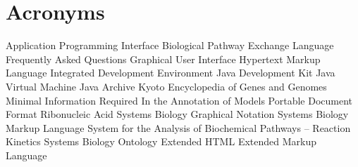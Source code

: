 \chapter{Acronyms}
\begin{acronym}
        {Application Programming Interface}
     {Biological Pathway Exchange Language}
        {Frequently Asked Questions}
        {Graphical User Interface}
       {Hypertext Markup Language}
        {Integrated Development Environment}
        {Java\texttrademark{} Development Kit}
        {Java\texttrademark{} Virtual Machine}
        {Java\texttrademark{} Archive}
       {Kyoto Encyclopedia of Genes and Genomes}
     {Minimal Information Required In the Annotation of Models}
        {Portable Document Format}
        {Ribonucleic Acid}
       {Systems Biology Graphical Notation}
       {Systems Biology Markup Language}
   {System for the Analysis of Biochemical Pathways -- Reaction Kinetics}
        {Systems Biology Ontology}
      {Extended \acs{HTML}}
        {Extended Markup Language}
\end{acronym}
